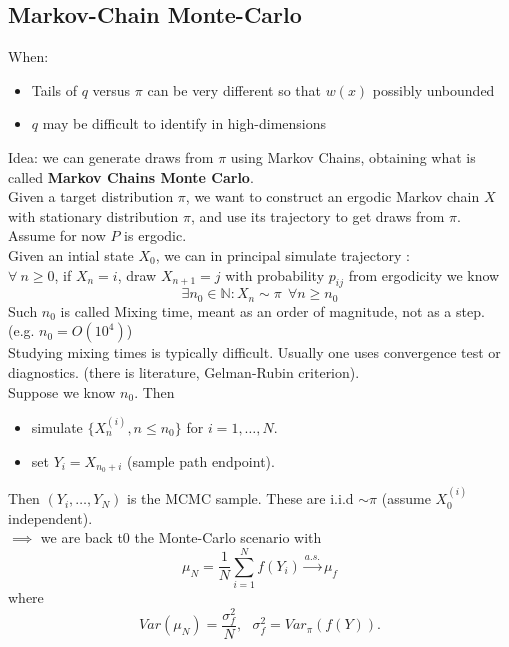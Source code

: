 \documentclass{article}
\begin{document}
\subsection{Markov-Chain Monte-Carlo}
When:
\begin{itemize}
    \item Tails of $q$ versus $\pi$ can be very different so that $w(x)$ possibly unbounded
    \item $q$ may be difficult to identify in high-dimensions
\end{itemize}
Idea: we can generate draws from $\pi$ using Markov Chains, obtaining what is called \textbf{Markov Chains Monte Carlo}.\\
Given a target distribution $\pi$, we want to construct an ergodic Markov chain $X$ with stationary distribution $\pi$, and use its trajectory to get draws from $\pi$. \\
Assume for now $P$ is ergodic. \\ Given an intial state $X_0$, we can in principal simulate trajectory :\\
$\forall \ n \geq 0 $, if $X_n = i$, draw $X_{n+1}=j$ with probability $p_{ij}$
from ergodicity we know 
\begin{equation*}
    \exists n_0 \in \mathbb{N}: X_n \sim \pi \ \ \forall n \geq n_0
\end{equation*}
Such $n_0$ is called Mixing time, meant as an order of magnitude, not as a step. (e.g. $n_0=O(10^4)$)\\
Studying mixing times is typically difficult. Usually one uses convergence test or diagnostics.
(there is literature, Gelman-Rubin criterion).\\
Suppose we know $n_0$. Then 
\begin{itemize}
    \item simulate $\{X_n ^{(i)}, n \leq n_0\}$ for $i=1, \dots, N$.
    \item set $Y_i = X_{n_0+i}$ (sample path endpoint).
\end{itemize}
Then $(Y_i, \dots, Y_N)$ is the MCMC sample. These are i.i.d $\sim \pi$ (assume $X_0^{(i)}$ independent).\\
$\implies$ we are back t0 the Monte-Carlo scenario with 
\begin{equation*}
    \mu_N = \frac{1}{N}\sum_{i=1}^N f(Y_i) \xrightarrow{a.s.} \mu_f
\end{equation*}
where 
\begin{equation*}
    Var(\mu_N)= \frac{\sigma_f^2}{N}, \  \  \ \sigma_f^2= Var_{\pi}(f(Y)). 
\end{equation*}
\end{document}
